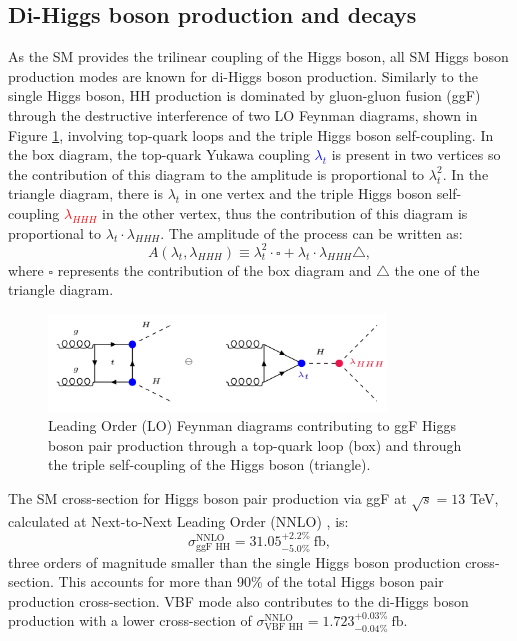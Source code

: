 \subsection{Di-Higgs boson production and decays} 
\label{chap1:HH:HPD}
As the SM provides the trilinear coupling of the Higgs boson, all SM Higgs boson production modes are known for di-Higgs boson production. Similarly to the single Higgs boson, HH production is dominated by gluon-gluon fusion (ggF) through the destructive interference of two LO Feynman diagrams, shown in Figure \ref{fig:chap1:HH:HPD:FY}, involving top-quark loops and the triple Higgs boson self-coupling. In the box diagram, the top-quark Yukawa coupling \textcolor{blue}{$\lambda_t$} is present in two vertices so the contribution of this diagram to the amplitude is proportional to $\lambda_t^2$. In the triangle diagram, there is $\lambda_t$ in one vertex and the triple Higgs boson self-coupling \textcolor{red}{$\lambda_{HHH}$} in the other vertex, thus the contribution of this diagram is proportional to $\lambda_t\cdot\lambda_{HHH}$. The amplitude of the process can be written as:
\begin{equation}
    A(\lambda_t, \lambda_{HHH}) \equiv \lambda_t^2\cdot\square + \lambda_t\cdot\lambda_{HHH}\bigtriangleup,
\end{equation}
where $\square$ represents the contribution of the box diagram and $\bigtriangleup$ the one of the triangle diagram. 
\begin{figure}[htbp]
    \centering
    \includegraphics[width=0.8\textwidth]{Ch1/Img/HH_feyn.png}
    \caption{Leading Order (LO) Feynman diagrams contributing to ggF Higgs boson pair production through a top-quark loop (box) and through the triple self-coupling of the Higgs boson (triangle).}
    \label{fig:chap1:HH:HPD:FY}
\end{figure}
The SM cross-section for Higgs boson pair production via ggF at $\sqrt{s}=13$ TeV, calculated at Next-to-Next Leading Order (NNLO) \cite{HHXSec1, HHXSec2}, is:
\begin{equation}
    \sigma_{\text{ggF HH}}^{\text{NNLO}} = 31.05_{-5.0\%}^{+2.2\%} \ \text{fb},
    \label{eq:chap1:HH:XSEC:NNL0}
\end{equation}
three orders of magnitude smaller than the single Higgs boson production cross-section. This accounts for more than 90\% of the total Higgs boson pair production cross-section. VBF mode also contributes to the di-Higgs boson production with a lower cross-section of $\sigma_{\text{VBF HH}}^{\text{NNLO}} = 1.723_{-0.04\%}^{+0.03\%} \ \text{fb}$. 

